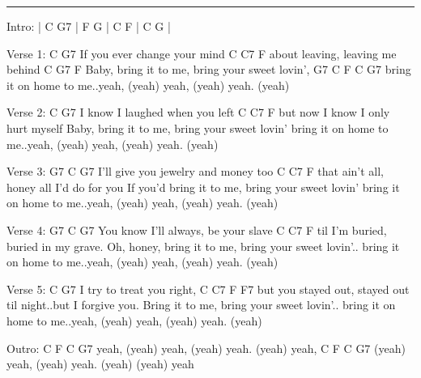 \noindent\rule{\columnwidth}{1pt}
\begin{lstsong}
Intro: | C G7 | F G | C F  | C G |

Verse 1:
       C                  G7
If you ever   change your mind
      C         C7            F
about leaving, leaving me behind
        C               G7               F
Baby, bring it to me, bring your sweet lovin',
G7                  C          F             C          G7
bring it on home to me..yeah, (yeah) yeah, (yeah) yeah. (yeah)

Verse 2:
          C                G7
I know I laughed when you left
          C      C7            F
but now I know I only hurt myself
Baby, bring it to me, bring your sweet lovin'
bring it on home to me..yeah, (yeah) yeah, (yeah) yeah. (yeah)

Verse 3:
G7            C                 G7
I'll give you jewelry and money too
            C         C7             F
that ain't all, honey all I'd do for you
If you'd bring it to me, bring your sweet lovin'
bring it on home to me..yeah, (yeah) yeah, (yeah) yeah. (yeah)

Verse 4:
G7            C               G7
You know I'll always, be your slave
         C       C7           F
til I'm buried, buried in my grave.
Oh, honey, bring it to me, bring your sweet lovin'..
bring it on home to me..yeah, (yeah) yeah, (yeah) yeah. (yeah)

Verse 5:
  C                G7
I try to treat you right,
         C           C7             F               F7
but you stayed out, stayed out til night..but I forgive you.
Bring it to me, bring your sweet lovin'..
bring it on home to me..yeah, (yeah) yeah, (yeah) yeah. (yeah)

Outro:
        C          F             C     G7
yeah, (yeah) yeah, (yeah) yeah. (yeah) yeah,
       C             F             C          G7
(yeah) yeah, (yeah) yeah. (yeah) (yeah) yeah
\end{lstsong}
\newpage
